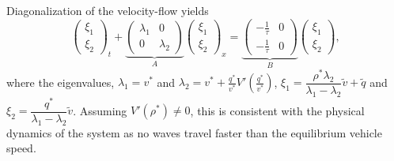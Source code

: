 \documentclass[letterpaper, 10 pt, conference]{ieeeconf}  %
\begin{document}
Diagonalization of the velocity-flow yields
{\footnotesize
\begin{equation} \label{vqlindiag}
\begin{pmatrix}
\xi_1 \\ \xi_2
\end{pmatrix}_t + 
\underset{A}{
	\underbrace{
	\begin{pmatrix}
		\lambda_1 & 0 \\
		0 & \lambda_2
	\end{pmatrix} 
	}
}
\begin{pmatrix}
\xi_1 \\ \xi_2
\end{pmatrix}_x = 
\underset{B}{
	\underbrace{
	\begin{pmatrix}
		-\frac{1}{\tau} & 0 \\
		-\frac{1}{\tau} & 0
	\end{pmatrix}}
}
\begin{pmatrix}
\xi_1 \\ \xi_2
\end{pmatrix},
\end{equation}
}
where the eigenvalues, $\lambda_1 = v^{*}$ and $\lambda_2 = v^{*} + \frac{q^{*}}{v^{*}} V'(\frac{q^{*}}{v^{*}})$, $\xi_1 = \dfrac{\rho^*\lambda_2}{\lambda_1 - \lambda_2}\tilde{v} + \tilde{q}$ and $\xi_2 = \dfrac{q^*}{\lambda_1 - \lambda_2}\tilde{v}$.
Assuming $V'(\rho^*) \neq 0$, this is consistent with the physical dynamics of the system as no waves travel faster than the equilibrium vehicle speed.\\
\end{document}
